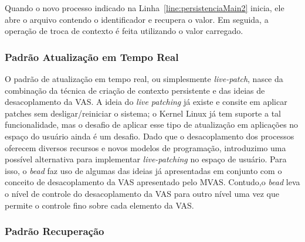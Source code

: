 Quando o novo processo indicado na Linha~\ref{line:persistenciaMain2} inicia, ele abre o arquivo contendo o identificador e recupera o valor. Em seguida, a operação de troca de contexto é feita utilizando o valor carregado.

\subsubsection{Padrão Atualização em Tempo Real}

O padrão de atualização em tempo real, ou simplesmente \emph{live-patch}, nasce da combinação da técnica de criação de contexto persistente e das ideias de desacoplamento da VAS. A ideia do \emph{live patching} já existe e consite em aplicar patches sem desligar/reiniciar o sistema; o Kernel Linux já tem suporte a tal funcionalidade, mas o desafio de aplicar esse tipo de atualização em aplicações no espaço do usuário ainda é um desafio. Dado que o desacoplamento dos processos oferecem diversos recursos e novos modelos de programação, introduzimo uma possível alternativa para implementar \emph{live-patching} no espaço de usuário. Para isso, o \emph{bead} faz uso de algumas das ideias já apresentadas em conjunto com o conceito de desacoplamento da VAS apresentado pelo MVAS. Contudo,o \emph{bead} leva o nível de controle do desacoplamento da VAS para outro nível uma vez que permite o controle fino sobre cada elemento da VAS.

\subsubsection{Padrão Recuperação}

